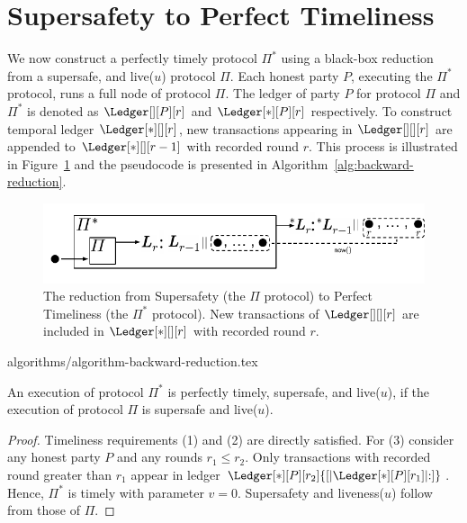 \section{Supersafety to Perfect Timeliness}\label{sec:backward-reduction}

We now construct a perfectly timely protocol $\Pi^*$
using a black-box reduction from a supersafe, and live($u$) protocol $\Pi$.
Each honest party $P$, executing the $\Pi^*$ protocol, runs a
full node of protocol $\Pi$.
The ledger of party $P$ for protocol $\Pi$ and $\Pi^*$ is denoted as $\Ledger[][P][r]$ and
$\Ledger[*][P][r]$ respectively.
To construct temporal ledger $\Ledger[*][][r]$,
new transactions appearing in
$\Ledger[][][r]$ are appended to $\Ledger[*][][r - 1]$ with recorded round $r$.
This process is illustrated
in Figure~\ref{fig:backward-reduction}
and the pseudocode is presented in Algorithm~\ref{alg:backward-reduction}.

\begin{figure}
  \centering
  \includegraphics[width=0.9\columnwidth,keepaspectratio]{figures/backward-reduction.pdf}
  \caption{The reduction from Supersafety
    (the $\Pi$ protocol) to Perfect Timeliness (the $\Pi^*$ protocol).
    New transactions of $\Ledger[][][r]$ are included in
    $\Ledger[*][][r]$ with recorded round $r$.
  }
 \label{fig:backward-reduction}
\end{figure}

{algorithms/algorithm-backward-reduction.tex}


\begin{theorem} \label{thm:backward-reduction}
  An execution of protocol $\Pi^*$ is perfectly timely, supersafe, and live($u$), if the execution of
  protocol $\Pi$ is supersafe and live($u$).
\end{theorem}
\begin{proof}
  Timeliness requirements (1) and (2) are directly satisfied.
  For (3) consider any honest party $P$ and any rounds $r_1 \leq r_2$.
  Only transactions with recorded round greater
  than $r_1$ appear in ledger $\Ledger[*][P][r_2]{[|\Ledger[*][P][r_1]|{:}]}$.
  Hence, $\Pi^*$ is timely with parameter $v = 0$.
  Supersafety and liveness($u$) follow from those of $\Pi$.
  \Qed
\end{proof}


